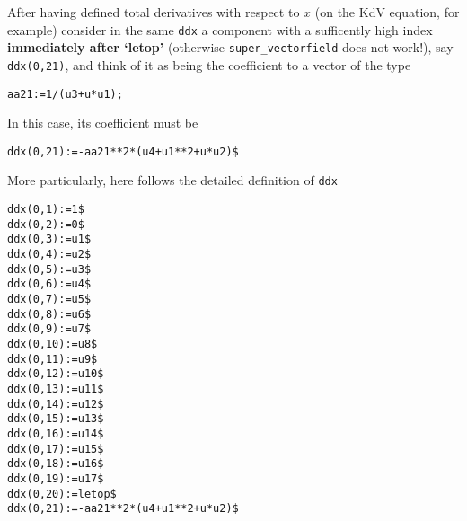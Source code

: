 After having defined total derivatives with respect to $x$ (on the KdV
equation, for example) consider in the same \texttt{ddx} a component with a
sufficently high index \textbf{immediately after `letop'} (otherwise
\texttt{super\_vectorfield} does not work!), say \texttt{ddx(0,21)}, and think
of it as being the coefficient to a vector of the type
\begin{verbatim}
aa21:=1/(u3+u*u1);
\end{verbatim}
In this case, its coefficient must be
\begin{verbatim}
ddx(0,21):=-aa21**2*(u4+u1**2+u*u2)$
\end{verbatim}
More particularly, here follows the detailed definition of \texttt{ddx}
\begin{verbatim}
ddx(0,1):=1$
ddx(0,2):=0$
ddx(0,3):=u1$
ddx(0,4):=u2$
ddx(0,5):=u3$
ddx(0,6):=u4$
ddx(0,7):=u5$
ddx(0,8):=u6$
ddx(0,9):=u7$
ddx(0,10):=u8$
ddx(0,11):=u9$
ddx(0,12):=u10$
ddx(0,13):=u11$
ddx(0,14):=u12$
ddx(0,15):=u13$
ddx(0,16):=u14$
ddx(0,17):=u15$
ddx(0,18):=u16$
ddx(0,19):=u17$
ddx(0,20):=letop$
ddx(0,21):=-aa21**2*(u4+u1**2+u*u2)$
\end{verbatim}

